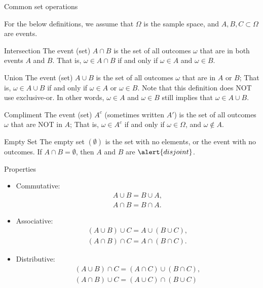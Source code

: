 \begin{frame}[allowframebreaks]{Common set operations}

For the below definitions, we assume that $\Omega$ is the sample space, and $A, B, C \subset \Omega$ are events.
    \begin{block}{Intersection}
      The event (set) $A \cap B$ is the set of all outcomes $\omega$ that are in both events $A$ and $B$. That is, $\omega \in A \cap B$ if and only if $\omega \in A$ and $\omega \in B$.
  \end{block}
  
      \begin{block}{Union}
      The event (set) $A \cup B$ is the set of all outcomes $\omega$ that are in $A$ or $B$; That is, $\omega \in A \cup B$ if and only if $\omega \in A$ or $\omega \in B$. Note that this definition does NOT use exclusive-or. In other words, $\omega \in A$ and $\omega \in B$ still implies that $\omega \in A \cup B$.
  \end{block}
  
  \begin{block}{Compliment}
      The event (set) $A^c$ (sometimes written $A'$) is the set of all outcomes $\omega$ that are NOT in $A$; That is, $\omega \in A^c$ if and only if $\omega \in \Omega$, and $\omega \notin A$.
  \end{block}
  
  \begin{block}{Empty Set}
    The \alert{empty set} $(\emptyset)$ is the set with no elements, or the event with no outcomes. If $A \cap B = \emptyset$, then $A$ and $B$ are $\alert{disjoint}$.
  \end{block}
  
\end{frame}

\begin{frame}[allowframebreaks]{Properties}
  \begin{itemize}
    \item Commutative: 
    \begin{align*}A \cup B = B \cup A,\\
    A \cap B = B \cap A.\end{align*}
    \item Associative: 
    \begin{align*}(A \cup B) \cup C = A \cup (B \cup C),\\ 
    (A \cap B) \cap C = A \cap (B \cap C).
    \end{align*}
    \item Distributive: 
    \begin{align*}
    (A \cup B) \cap C = (A \cap C) \cup (B \cap C),\\
    (A \cap B) \cup C = (A \cup C) \cap (B \cup C)
    \end{align*}
  \end{itemize}
\end{frame}

